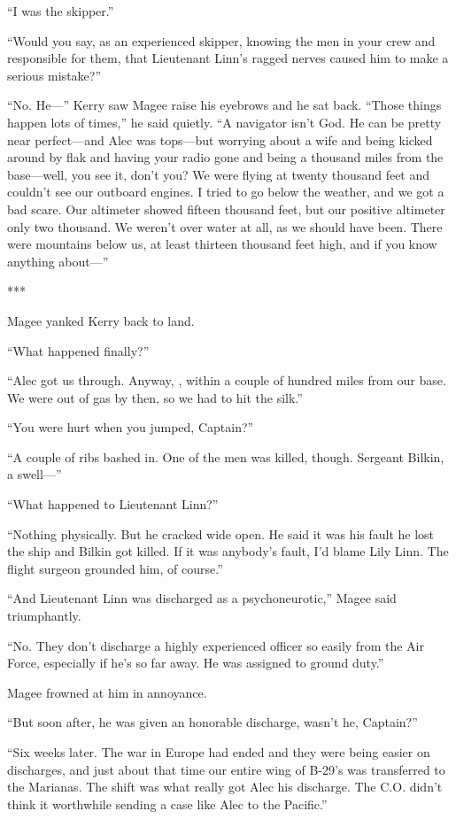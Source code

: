 {“I was the skipper.”

“Would you say, as an experienced skipper, knowing the men in your crew and responsible for them, that Lieutenant Linn’s ragged nerves caused him to make a serious mistake?”

“No. He—” Kerry saw Magee raise his eyebrows and he sat back. “Those things happen lots of times,” he said quietly. “A navigator isn’t God. He can be pretty near perfect—and Alec was tops—but worrying about a wife and being kicked around by flak and having your radio gone and being a thousand miles from the base—well, you see it, don’t you? We were flying at twenty thousand feet and couldn’t see our outboard engines. I tried to go below the weather, and we got a bad scare. Our altimeter showed fifteen thousand feet, but our positive altimeter only two thousand. We weren’t over water at all, as we should have been. There were mountains below us, at least thirteen thousand feet high, and if you know anything about—”

***

Magee yanked Kerry back to land.

“What happened finally?”

“Alec got us through. Anyway, , within a couple of hundred miles from our base. We were out of gas by then, so we had to hit the silk.”

“You were hurt when you jumped, Captain?”

“A couple of ribs bashed in. One of the men was killed, though. Sergeant Bilkin, a swell—”

“What happened to Lieutenant Linn?”

“Nothing physically. But he cracked wide open. He said it was his fault he lost the ship and Bilkin got killed. If it was anybody’s fault, I’d blame Lily Linn. The flight surgeon grounded him, of course.”

“And Lieutenant Linn was discharged as a psychoneurotic,” Magee said triumphantly.

“No. They don’t discharge a highly experienced officer so easily from the Air Force, especially if he’s so far away. He was assigned to ground duty.”

Magee frowned at him in annoyance.

“But soon after, he was given an honorable discharge, wasn’t he, Captain?”

“Six weeks later. The war in Europe had ended and they were being easier on discharges, and just about that time our entire wing of B-29’s was transferred to the Marianas. The shift was what really got Alec his discharge. The C.O. didn’t think it worthwhile sending a case like Alec to the Pacific.”

}
